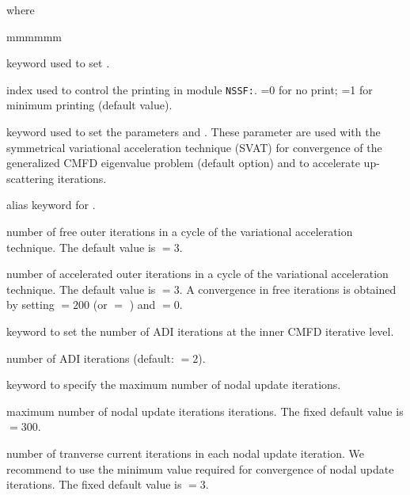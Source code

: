 \noindent where
\begin{ListeDeDescription}{mmmmmm}

\item[\moc{EDIT}] keyword used to set .

\item[\dusa{iprint}] index used to control the printing  in module {\tt NSSF:}.
=0 for no print; =1 for minimum printing (default value).

\item[\moc{VAR1}] keyword used to set the parameters  and . These parameter are used with the symmetrical variational
acceleration technique (SVAT) for convergence of the generalized CMFD eigenvalue problem (default option) and to accelerate up-scattering iterations.

\item[\moc{ACCE}] alias keyword for .

\item[\dusa{icl1}] number of free outer iterations in a cycle of the variational acceleration technique.
The default value is  $=3$.

\item[\dusa{icl2}] number of accelerated outer iterations  in a cycle of the
variational acceleration technique. The default value is  $=3$. A convergence in free iterations is
obtained by setting  $=200$ (or  $=$ ) and  $=0$.

\item[\moc{ADI}] keyword to set the number of ADI iterations at the inner CMFD iterative level.

\item[\dusa{nadi}] number of ADI iterations (default:  $=2$).

\item[\moc{NUPD}] keyword to specify the maximum number of nodal update iterations. 

\item[\dusa{max\_no\_nodal\_iter}] maximum number of nodal update iterations iterations. The fixed default
value is  $=300$.

\item[\dusa{no\_transverse\_iter}] number of tranverse current iterations in each nodal update iteration. We recommend to use the minimum value required for convergence of nodal update iterations. The fixed default
value is  $=3$.


\end{ListeDeDescription}
